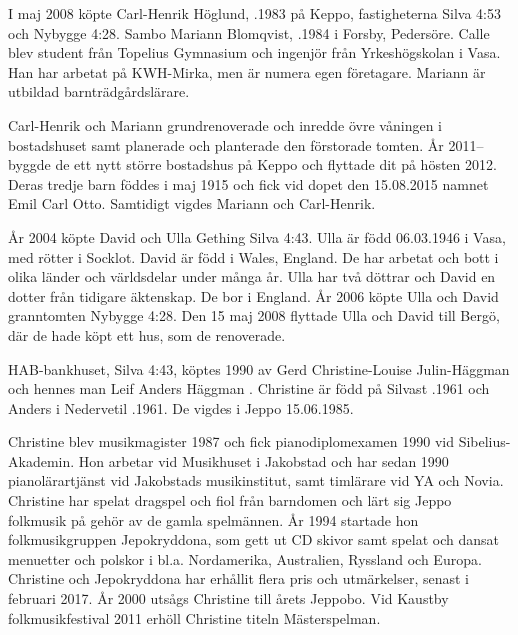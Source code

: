 I maj 2008 köpte Carl-Henrik Höglund, .1983 på Keppo, fastigheterna Silva 4:53 och Nybygge 4:28. Sambo Mariann Blomqvist, .1984 i Forsby, Pedersöre. Calle blev student från Topelius Gymnasium och ingenjör från Yrkeshögskolan i Vasa. Han har arbetat på KWH-Mirka, men är numera egen företagare. Mariann är utbildad barnträdgårdslärare.
\begin{jhchildren}
  \item {}
  \item {}
  \item {}
\end{jhchildren}
Carl-Henrik och Mariann grundrenoverade och inredde övre våningen i bostadshuset samt planerade och planterade den förstorade tomten. År 2011-- byggde de ett nytt större bostadshus på Keppo och flyttade dit på hösten 2012. Deras tredje barn föddes i maj 1915 och fick vid dopet den 15.08.2015 namnet Emil Carl Otto. Samtidigt vigdes Mariann och Carl-Henrik.


År 2004 köpte David och Ulla Gething Silva 4:43. Ulla är född 06.03.1946 i Vasa, med rötter i Socklot. David är född i Wales, England. De har arbetat och bott i olika länder och världsdelar under många år. Ulla har två döttrar och David en dotter från tidigare äktenskap. De bor i England. År 2006 köpte Ulla och David granntomten Nybygge 4:28. Den 15 maj 2008 flyttade Ulla och David till Bergö, där de hade köpt ett hus, som de renoverade.


HAB-bankhuset, Silva 4:43, köptes 1990 av Gerd Christine-Louise Julin-Häggman och hennes man Leif Anders Häggman	. Christine är född på Silvast .1961 och Anders i Nedervetil .1961. De vigdes i Jeppo 15.06.1985.

Christine blev musikmagister 1987 och fick pianodiplomexamen 1990 vid Sibelius-Akademin. Hon arbetar vid Musikhuset i Jakobstad och har sedan 1990 pianolärartjänst vid Jakobstads musikinstitut, samt timlärare vid YA och Novia. Christine har spelat dragspel och fiol från barndomen och lärt sig Jeppo folkmusik på gehör av de gamla spelmännen. År 1994 startade hon folkmusikgruppen Jepokryddona, som gett ut CD skivor samt spelat och dansat menuetter och polskor i bl.a. Nordamerika, Australien, Ryssland och Europa. Christine och Jepokryddona har erhållit flera pris och utmärkelser, senast i februari 2017. År 2000 utsågs Christine till årets Jeppobo. Vid Kaustby folkmusikfestival 2011 erhöll Christine titeln Mästerspelman.

